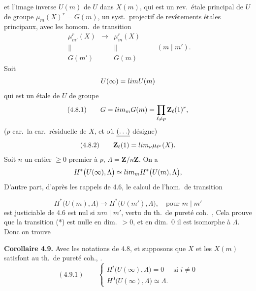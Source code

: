 \documentclass[11pt,a4paper]{article}
\begin{document}
et l'image inverse $U(m)$ de $U$ dans $X(m)$, qui est un rev.\ étale principal de $U$ de groupe $\mu_m(X)^r = G(m)$, \struck{\ill{}}  un syst.\ projectif de  revêtements étales principaux,  avec les homom.\ de transition 
\[
\begin{array}{ccc}
\mu_{m'}^r(X) & \longrightarrow & \mu_m^r(X) \\
\| & & \| \\
G(m') & & G(m)
\end{array}
\qquad (m \mid m') .
\]
Soit 
\[
U(\infty) = \varprojlim U(m)
\]
qui est un   étale  de $U$ de groupe
\[
(4.8.1) \qquad G = \varprojlim_m G(m) = \prod_{\ell \neq p} \mathbf{Z}_\ell(1)^r ,
\]
($p$ car.\ la car.\ résiduelle de $X$, et où $\uncertain{(\ldots)}$ \ill{} \ill{} désigne)
\[
(4.8.2) \qquad \mathbf{Z}_\ell(1) = \varprojlim_\nu \mu_{\ell^\nu}(X) .
\]
Soit $n$ un entier $\geq 0$ premier à $p$,  $\Lambda = \mathbf{Z}/n\mathbf{Z}$.  On a
\[
H^*\bigl(U(\infty), \Lambda\bigr) \simeq \varinjlim_m H^*\bigl(U(m), \Lambda\bigr) ,
\]
  D'autre part, d'après les rappels de 4.6, le calcul de l'hom.\ de transition


\[
H^*\bigl(U(m), \Lambda\bigr) \longrightarrow H^*\bigl(U(m'), \Lambda\bigr) , \quad \text{pour } m \mid m'
\]
est justiciable de 4.6  \struck{\ill{}}    est nul si $nm \mid m'$,  vertu du th.\ de pureté coh.\ , Cela prouve que la transition  (*) est nulle en dim.\ $> 0$, et en dim.\ $0$ il est  isomorphe à $\Lambda$. Donc on trouve

\textbf{Corollaire 4.9.} Avec les notations de 4.8, et supposons que $X$ et les $X(m)$ satisfont au th.\ de pureté coh., \struck{\ill{}} \ill{}. 
\[
(4.9.1) \qquad
\begin{cases}
H^i\bigl(U(\infty), \Lambda\bigr) = 0 & \text{si } i \neq 0 \\
H^0\bigl(U(\infty), \Lambda\bigr) \simeq \Lambda .
\end{cases}
\]
\end{document}
